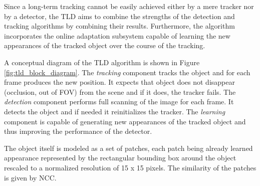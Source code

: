 Since a long-term tracking cannot be easily achieved either by a mere tracker nor by a detector, the TLD aims to combine the strengths of the detection and tracking algorithms by combining their results. Furthermore, the algorithm incorporates the online adaptation subsystem capable of learning the new appearances of the tracked object over the course of the tracking.

A conceptual diagram of the TLD algorithm is shown in Figure \ref{fig:tld_block_diagram}. The \textit{tracking} component tracks the object and for each frame produces the new position. It expects that object does not disappear (occlusion, out of FOV) from the scene and if it does, the tracker fails. The \textit{detection} component performs full scanning of the image for each frame. It detects the object and if needed it reinitializes the tracker. The \textit{learning} component is capable of generating new appearances of the tracked object and thus improving the performance of the detector. 

The object itself is modeled as a set of patches, each patch being already learned appearance represented by the rectangular bounding box around the object rescaled to a normalized resolution of 15 x 15 pixels. The similarity of the patches is given by NCC.

